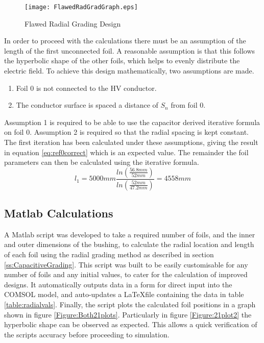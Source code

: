 \begin{figure}[!h]
   \centering
   \texttt{[image: FlawedRadGradGraph.eps]}
   \caption{Flawed Radial Grading Design}
   \label{figure:flawedgraph}
\end{figure}

In order to proceed with the calculations there must be an assumption of the length of the first unconnected foil.
A reasonable assumption is that this follows the hyperbolic shape of the other foils, which helps to evenly distribute the electric field.
To achieve this design mathematically, two assumptions are made.
\begin{enumerate}
\item Foil 0 is not connected to the HV conductor.
\item The conductor surface is spaced a distance of $S_n$ from foil 0.
\end{enumerate}
Assumption 1 is required to be able to use the capacitor derived iterative formula on foil 0.
Assumption 2 is required so that the radial spacing is kept constant.
The first iteration has been calculated under these assumptions, giving the result in equation \ref{eq:ref0correct} which is an expected value.
The remainder the foil parameters can then be calculated using the iterative formula.
\begin{equation}
   \label{eq:ref0correct}
   l_{1}
   = 5000mm\displaystyle\frac{{ln(\displaystyle\frac{56.8mm}{52mm})} }{ln(\displaystyle\frac{52mm}{47.2mm})}
   = 4558mm
\end{equation}

\subsection{Matlab Calculations}
A Matlab script was developed to take a required number of foils, and the inner and outer dimensions of the bushing, to calculate the radial location and length of each foil using the radial grading method as described in section \ref{ss:CapacitiveGrading}.
This script was built to be easily customisable for any number of foils and any initial values, to cater for the calculation of improved designs.
It automatically outputs data in a form for direct input into the COMSOL model, and auto-updates a \LaTeX  file containing the data in table \ref{table:radialvals}.
Finally, the script plots the calculated foil positions in a graph shown in figure \ref{Figure:Both21plots}.
Particularly in figure \ref{Figure:21plot2} the hyperbolic shape can be observed as expected.
This allows a quick verification of the scripts accuracy before proceeding to simulation.

